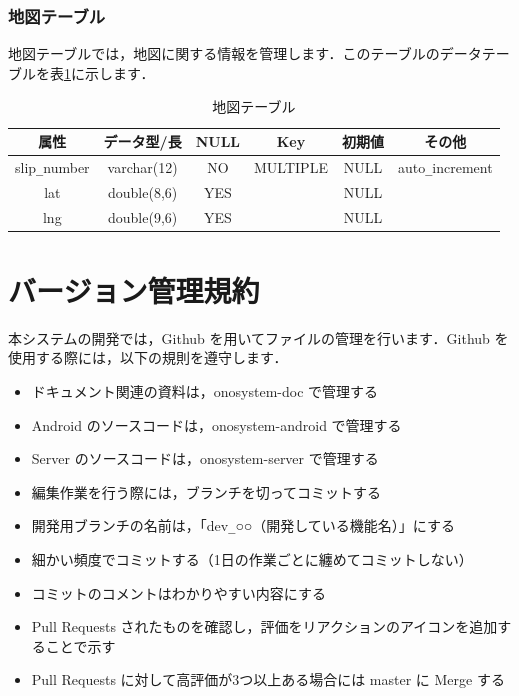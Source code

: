 \documentclass[a4j,titlepage]{jarticle}
\begin{document}
\subsubsection{地図テーブル}
地図テーブルでは，地図に関する情報を管理します．このテーブルのデータテーブルを表\ref{map}に示します．
\begin{table}[htb]
  \caption{地図テーブル}
  \label{map}
  \begin{center}
    \begin{tabular}{|c|c|c|c|c|c|} \hline
      属性 & データ型/長 & NULL & Key & 初期値 & その他 \\ \hline \hline
      slip\verb|_|number & varchar(12) & NO & MULTIPLE & NULL & auto\verb|_|increment\\ \hline
      lat & double(8,6) & YES &   & NULL & \\ \hline
      lng & double(9,6) & YES &   & NULL & \\ \hline
    \end{tabular}
  \end{center}
\end{table}


\section{バージョン管理規約}
本システムの開発では，Github を用いてファイルの管理を行います．Github を使用する際には，以下の規則を遵守します．
\begin{itemize}
\item ドキュメント関連の資料は，onosystem-doc で管理する
\item Android のソースコードは，onosystem-android で管理する
\item Server のソースコードは，onosystem-server で管理する
\item 編集作業を行う際には，ブランチを切ってコミットする
\item 開発用ブランチの名前は，「dev\verb|_|○○（開発している機能名）」にする
\item 細かい頻度でコミットする（1日の作業ごとに纏めてコミットしない）
\item コミットのコメントはわかりやすい内容にする
\item Pull Requests されたものを確認し，評価をリアクションのアイコンを追加することで示す
\item Pull Requests に対して高評価が3つ以上ある場合には master に Merge する
\end{itemize}
\end{document}
